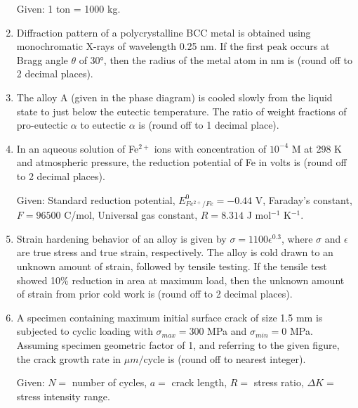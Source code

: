 \documentclass[12pt]{article}
\begin{document}
\begin{enumerate}
Given: 1 ton = 1000 kg.

\item Diffraction pattern of a polycrystalline BCC metal is obtained using monochromatic X-rays of wavelength 0.25 nm. If the first peak occurs at Bragg angle \(\theta\) of 30°, then the radius of the metal atom in nm is \underline{\hspace{2cm}} (round off to 2 decimal places).

\item The alloy A (given in the phase diagram) is cooled slowly from the liquid state to just below the eutectic temperature. The ratio of weight fractions of pro-eutectic \(\alpha\) to eutectic \(\alpha\) is \underline{\hspace{2cm}} (round off to 1 decimal place).

\item In an aqueous solution of Fe\(^{2+}\) ions with concentration of \(10^{-4}\) M at 298 K and atmospheric pressure, the reduction potential of Fe in volts is \underline{\hspace{2cm}} (round off to 2 decimal places).

Given: Standard reduction potential, \(E_{Fe^{2+}/Fe}^0 = -0.44\) V, Faraday's constant, \(F=96500\) C/mol, Universal gas constant, \(R =8.314\) J mol\(^{-1}\) K\(^{-1}\).

\item Strain hardening behavior of an alloy is given by \(\sigma = 1100 \epsilon^{0.3}\), where \(\sigma\) and \(\epsilon\) are true stress and true strain, respectively. The alloy is cold drawn to an unknown amount of strain, followed by tensile testing. If the tensile test showed 10\% reduction in area at maximum load, then the unknown amount of strain from prior cold work is \underline{\hspace{2cm}} (round off to 2 decimal places).

\item A specimen containing maximum initial surface crack of size 1.5 mm is subjected to cyclic loading with \(\sigma_{max}=300\) MPa and \(\sigma_{min}=0\) MPa. Assuming specimen geometric factor of 1, and referring to the given figure, the crack growth rate in \(\mu m/\)cycle is \underline{\hspace{2cm}} (round off to nearest integer).

Given: \(N=\) number of cycles, \(a=\) crack length, \(R=\) stress ratio, \(\Delta K=\) stress intensity range.


\end{enumerate}
\end{document}
